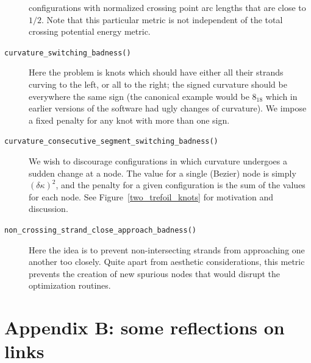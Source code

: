\documentclass{birkjour}
\theoremstyle{definition}
\theoremstyle{remark}
\numberwithin{equation}{section}
\begin{document}
\begin{description}
  configurations with normalized crossing point arc lengths that are
  close to $1/2$.  Note that this particular metric is not independent
  of the total crossing potential energy metric.
\item[{\tt curvature\_switching\_badness()}] Here the problem is knots
  which should have either all their strands curving to the left, or
  all to the right; the signed curvature should be everywhere the same
  sign (the canonical example would be $8_{18}$ which in earlier
  versions of the software had ugly changes of curvature).  We impose
  a fixed penalty for any knot with more than one sign.
\item[{\tt curvature\_consecutive\_segment\_switching\_badness()}] We
  wish to discourage configurations in which curvature undergoes a
  sudden change at a node.  The value for a single (Bezier) node is
  simply $\left(\delta\kappa\right)^2$, and the penalty for a given
  configuration is the sum of the values for each node.  See
  Figure~\ref{two_trefoil_knots} for motivation and discussion.
\item[{\tt non\_crossing\_strand\_close\_approach\_badness()}] Here
  the idea is to prevent non-intersecting strands from approaching one
  another too closely.  Quite apart from aesthetic considerations,
  this metric prevents the creation of new spurious nodes that would
  disrupt the optimization routines.
\end{description}

\section*{Appendix B: some reflections on links}
\end{document}
